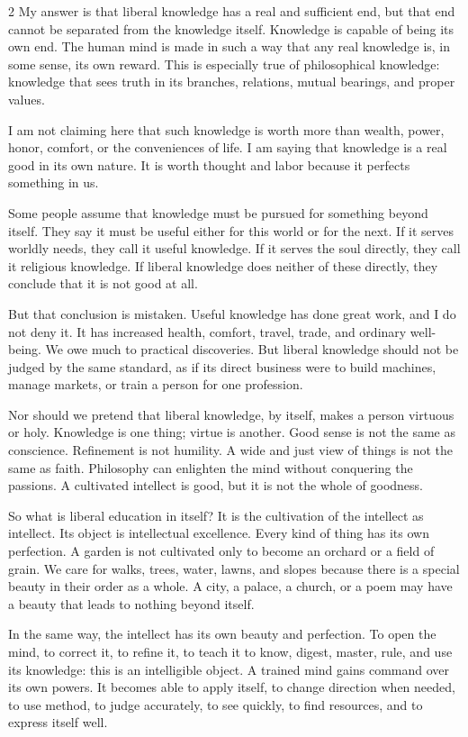 \documentclass[12pt]{article}
\begin{document}
\begin{multicols}{2}
My answer is that liberal knowledge has a real and sufficient end, but that end cannot be separated from the knowledge itself. Knowledge is capable of being its own end. The human mind is made in such a way that any real knowledge is, in some sense, its own reward. This is especially true of philosophical knowledge: knowledge that sees truth in its branches, relations, mutual bearings, and proper values.

I am not claiming here that such knowledge is worth more than wealth, power, honor, comfort, or the conveniences of life. I am saying that knowledge is a real good in its own nature. It is worth thought and labor because it perfects something in us.

Some people assume that knowledge must be pursued for something beyond itself. They say it must be useful either for this world or for the next. If it serves worldly needs, they call it useful knowledge. If it serves the soul directly, they call it religious knowledge. If liberal knowledge does neither of these directly, they conclude that it is not good at all.

But that conclusion is mistaken. Useful knowledge has done great work, and I do not deny it. It has increased health, comfort, travel, trade, and ordinary well-being. We owe much to practical discoveries. But liberal knowledge should not be judged by the same standard, as if its direct business were to build machines, manage markets, or train a person for one profession.

Nor should we pretend that liberal knowledge, by itself, makes a person virtuous or holy. Knowledge is one thing; virtue is another. Good sense is not the same as conscience. Refinement is not humility. A wide and just view of things is not the same as faith. Philosophy can enlighten the mind without conquering the passions. A cultivated intellect is good, but it is not the whole of goodness.

So what is liberal education in itself? It is the cultivation of the intellect as intellect. Its object is intellectual excellence. Every kind of thing has its own perfection. A garden is not cultivated only to become an orchard or a field of grain. We care for walks, trees, water, lawns, and slopes because there is a special beauty in their order as a whole. A city, a palace, a church, or a poem may have a beauty that leads to nothing beyond itself.

In the same way, the intellect has its own beauty and perfection. To open the mind, to correct it, to refine it, to teach it to know, digest, master, rule, and use its knowledge: this is an intelligible object. A trained mind gains command over its own powers. It becomes able to apply itself, to change direction when needed, to use method, to judge accurately, to see quickly, to find resources, and to express itself well.


\end{multicols}
\end{document}
